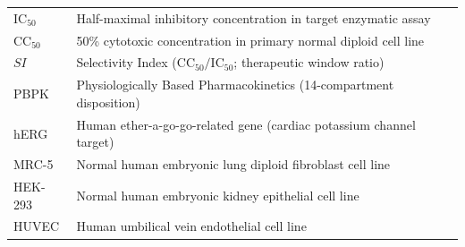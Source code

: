 \documentclass[11pt,a4paper]{article}
\begin{document}
\begin{table}[h!]
\begin{tabular}{lp{10.5cm}}
$\text{IC}_{50}$ & Half-maximal inhibitory concentration in target enzymatic assay \\
$\text{CC}_{50}$ & 50\% cytotoxic concentration in primary normal diploid cell line \\
$SI$ & Selectivity Index ($\text{CC}_{50} / \text{IC}_{50}$; therapeutic window ratio) \\
PBPK & Physiologically Based Pharmacokinetics (14-compartment disposition) \\
hERG & Human ether-a-go-go-related gene (cardiac potassium channel target) \\
MRC-5 & Normal human embryonic lung diploid fibroblast cell line \\
HEK-293 & Normal human embryonic kidney epithelial cell line \\
HUVEC & Human umbilical vein endothelial cell line \\
\bottomrule
\end{tabular}
\end{table}

\vspace{1em}
\end{document}

